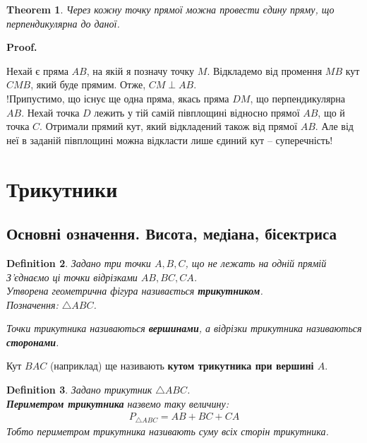 \documentclass[a4paper, 10pt]{article}
\makeatletter
\def\qed{$\blacksquare$}
\theoremstyle{theoremdd}
\newtheorem{theorem}{Theorem}[subsection]
\theoremstyle{theoremdd}
\theoremstyle{theoremdd}
\newtheorem{definition}[theorem]{Definition}
\theoremstyle{theoremdd}
\theoremstyle{theoremdd}
\theoremstyle{theoremdd}
\theoremstyle{theoremdd}
\theoremstyle{theoremdd}
\theoremstyle{theoremdd}
\renewenvironment{proof}[1][Proof.\\]{\par
\pushQED{\hfill \qed}%
\normalfont \topsep6\p@\@plus6\p@\relax
\trivlist
\item\relax
{\bfseries
#1\@addpunct{.}}\hspace\labelsep\ignorespaces
}{%
\popQED\endtrivlist\@endpefalse
}
\makeatother
\begin{document}
\begin{theorem}
Через кожну точку прямої можна провести єдину пряму, що перпендикулярна до даної.
\end{theorem}

\begin{proof}
Нехай є пряма $AB$, на якій я позначу точку $M$. Відкладемо від промення $MB$ кут $CMB$, який буде прямим. Отже, $CM \perp AB$.\\
!Припустимо, що існує ще одна пряма, якась пряма $DM$, що перпендикулярна $AB$. Нехай точка $D$ лежить у тій самій півплощині відносно прямої $AB$, що й точка $C$. Отримали прямий кут, який відкладений також від прямої $AB$. Але від неї в заданій півплощині можна відкласти лише єдиний кут -- суперечність!
\end{proof}
\newpage


\section{Трикутники}
\subsection{Основні означення. Висота, медіана, бісектриса}
\begin{definition}
Задано три точки $A,B,C$, що не лежать на одній прямій З'єднаємо ці точки відрізками $AB,BC,CA$.\\
Утворена геометрична фігура називається \textbf{трикутником}.\\
Позначення: $\triangle ABC$.
\begin{figure}[H]
\centering
{}
\end{figure}
Точки трикутника називаються \textbf{вершинами}, а відрізки трикутника називаються \textbf{сторонами}.
\end{definition}

Кут $BAC$ (наприклад) ще називають \textbf{кутом трикутника при вершині $A$}.

\begin{definition} Задано трикутник $\triangle ABC$.\\
\textbf{Периметром трикутника} назвемо таку величину:
\begin{align*}
P_{\triangle ABC} = AB + BC + CA
\end{align*}
Тобто периметром трикутника називають суму всіх сторін трикутника.
\end{definition}
\end{document}
